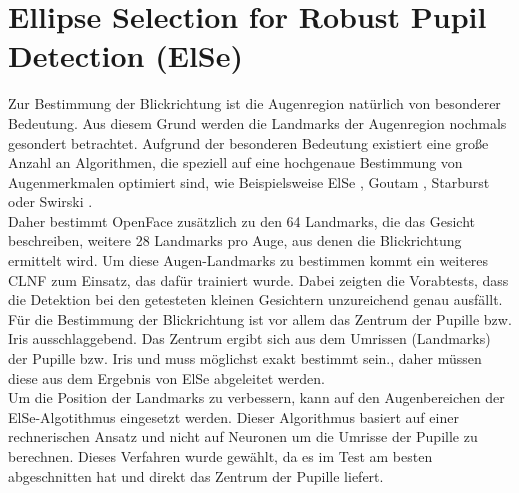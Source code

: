 \section{Ellipse Selection for Robust Pupil Detection (ElSe)}
\label{ElSe}
Zur Bestimmung der Blickrichtung ist die Augenregion natürlich von besonderer Bedeutung. Aus diesem Grund werden die Landmarks der Augenregion nochmals gesondert betrachtet. Aufgrund der besonderen Bedeutung existiert eine große Anzahl an Algorithmen, die speziell auf eine hochgenaue Bestimmung von Augenmerkmalen optimiert sind, wie Beispielsweise ElSe \cite{ElSe}, Goutam \cite{Eye_FastCorner}, Starburst \cite{Starburst} oder Swirski \cite{Swirski2012}.\\
Daher bestimmt OpenFace zusätzlich zu den 64 Landmarks, die das Gesicht beschreiben, weitere 28 Landmarks pro Auge, aus denen die Blickrichtung ermittelt wird. Um diese Augen-Landmarks zu bestimmen kommt ein weiteres CLNF zum Einsatz, das dafür trainiert wurde. Dabei zeigten die Vorabtests, dass die Detektion bei den getesteten kleinen Gesichtern unzureichend genau ausfällt.\\
Für die Bestimmung der Blickrichtung ist vor allem das Zentrum der Pupille bzw. Iris ausschlaggebend. Das Zentrum ergibt sich aus dem Umrissen (Landmarks) der Pupille bzw. Iris und muss möglichst exakt bestimmt sein., daher müssen diese aus dem Ergebnis von ElSe abgeleitet werden.\\
Um die Position der Landmarks zu verbessern, kann auf den Augenbereichen der ElSe-Algotithmus eingesetzt werden. Dieser Algorithmus basiert auf einer rechnerischen Ansatz und nicht auf Neuronen um die Umrisse der Pupille zu berechnen. Dieses Verfahren wurde gewählt, da es im Test \cite{ElSe} am besten abgeschnitten hat und direkt das Zentrum der Pupille liefert.
